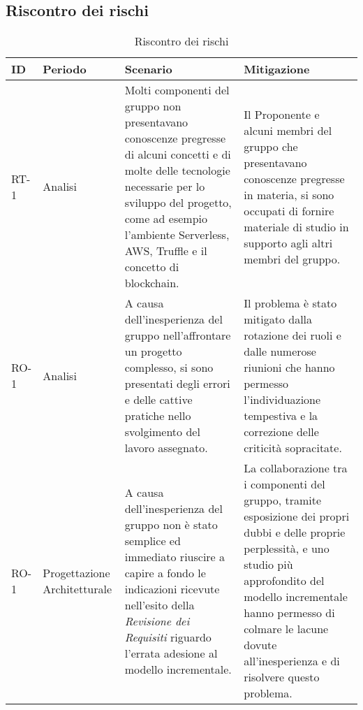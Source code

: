 \begin{appendices}
\section{Riscontro dei rischi}
	\begin{longtable}{
		>{\centering}p{}
		>{\centering}p{}
		>{\centering\arraybackslash}p{}
		>{\centering\arraybackslash}p{} }

		\caption {Riscontro dei rischi} \\

		\textbf{\color{white}ID} &
		\textbf{\color{white}Periodo} &
		\textbf{\color{white}Scenario} &
		\textbf{\color{white}Mitigazione}
		\tabularnewline
		\endhead

		RT-1
		&
		Analisi
		&
		Molti componenti del gruppo \Gruppo{} non presentavano conoscenze pregresse di alcuni concetti e di molte delle tecnologie necessarie per lo sviluppo del progetto, come ad esempio l'ambiente\ped{\textit{G}} Serverless\ped{\textit{G}}, AWS\ped{\textit{G}}, Truffle\ped{\textit{G}} e il concetto di blockchain\ped{\textit{G}}.
		&
		Il Proponente\ped{\textit{G}} e alcuni membri del gruppo che presentavano conoscenze pregresse in materia, si sono occupati di fornire materiale di studio in supporto agli altri membri del gruppo.\\

		RO-1
		&
		Analisi
		&
		A causa dell'inesperienza del gruppo nell'affrontare un progetto complesso, si sono presentati degli errori e delle cattive pratiche nello svolgimento del lavoro assegnato.
		&
		Il problema è stato mitigato dalla rotazione dei ruoli e dalle numerose riunioni che hanno permesso l'individuazione tempestiva e la correzione delle criticità sopracitate.\\
\hline
		RO-1
		&
		Progettazione Architetturale
		&
		A causa dell'inesperienza del gruppo non è stato semplice ed immediato riuscire a capire a fondo le indicazioni ricevute nell'esito della \textit{Revisione dei Requisiti} riguardo l'errata adesione al modello incrementale.
		&
		La collaborazione tra i componenti del gruppo, tramite esposizione dei propri dubbi e delle proprie perplessità, e uno studio più approfondito del modello incrementale hanno permesso di colmare le lacune dovute all'inesperienza e di risolvere questo problema.\\


\end{longtable}
\end{appendices}
